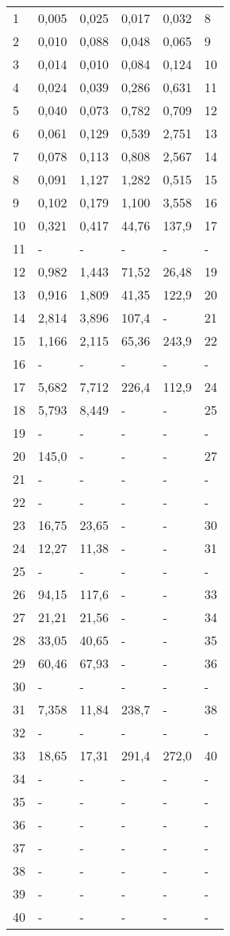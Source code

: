 \begin{center}
\begin{longtable}{|l|l|l|l|l|l|}
1 & 0,005 & 0,025 & 0,017 & 0,032 & 8 \\
2 & 0,010 & 0,088 & 0,048 & 0,065 & 9 \\
3 & 0,014 & 0,010 & 0,084 & 0,124 & 10 \\
4 & 0,024 & 0,039 & 0,286 & 0,631 & 11 \\
5 & 0,040 & 0,073 & 0,782 & 0,709 & 12 \\
6 & 0,061 & 0,129 & 0,539 & 2,751 & 13 \\
7 & 0,078 & 0,113 & 0,808 & 2,567 & 14 \\
8 & 0,091 & 1,127 & 1,282 & 0,515 & 15 \\
9 & 0,102 & 0,179 & 1,100 & 3,558 & 16 \\
10 & 0,321 & 0,417 & 44,76 & 137,9 & 17 \\
11 & - & - & - & - & - \\
12 & 0,982 & 1,443 & 71,52 & 26,48 & 19 \\
13 & 0,916 & 1,809 & 41,35 & 122,9 & 20 \\
14 & 2,814 & 3,896 & 107,4 & - & 21 \\
15 & 1,166 & 2,115 & 65,36 & 243,9 & 22 \\
16 & - & - & - & - & - \\
17 & 5,682 & 7,712 & 226,4 & 112,9 & 24 \\
18 & 5,793 & 8,449 & - & - & 25 \\
19 & - & - & - & - & - \\
20 & 145,0 & - & - & - & 27 \\
21 & - & - & - & - & - \\
22 & - & - & - & - & - \\
23 & 16,75 & 23,65 & - & - & 30 \\
24 & 12,27 & 11,38 & - & - & 31 \\
25 & - & - & - & - & - \\
26 & 94,15 & 117,6 & - & - & 33 \\
27 & 21,21 & 21,56 & - & - & 34 \\
28 & 33,05 & 40,65 & - & - & 35 \\
29 & 60,46 & 67,93 & - & - & 36 \\
30 & - & - & - & - & - \\
31 & 7,358 & 11,84 & 238,7 & - & 38 \\
32 & - & - & - & - & - \\
33 & 18,65 & 17,31 & 291,4 & 272,0 & 40 \\
34 & - & - & - & - & - \\
35 & - & - & - & - & - \\
36 & - & - & - & - & - \\
37 & - & - & - & - & - \\
38 & - & - & - & - & - \\
39 & - & - & - & - & - \\
40 & - & - & - & - & - \\
\end{longtable}
\end{center}